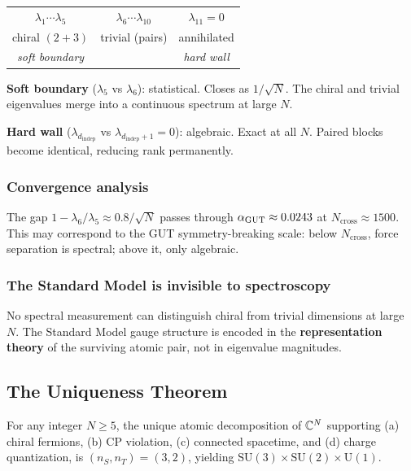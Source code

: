 \begin{center}
\begin{tabular}{ccc}
$\lambda_1 \cdots \lambda_5$ & $\lambda_6 \cdots \lambda_{10}$ & $\lambda_{11} = 0$ \\
chiral $(2+3)$ & trivial (pairs) & annihilated \\
\emph{soft boundary} & & \emph{hard wall} \\
\end{tabular}
\end{center}

\textbf{Soft boundary} ($\lambda_5$ vs $\lambda_6$): statistical. Closes as $1/\sqrt{N}$. The chiral and trivial eigenvalues merge into a continuous spectrum at large $N$.

\textbf{Hard wall} ($\lambda_{d_\text{indep}}$ vs $\lambda_{d_\text{indep}+1} = 0$): algebraic. Exact at all $N$. Paired blocks become identical, reducing rank permanently.

\subsubsection{Convergence analysis}

The gap $1 - \lambda_6/\lambda_5 \approx 0.8/\sqrt{N}$ passes through $\alpha_{\mathrm{GUT}} \approx 0.0243$ at $N_\text{cross} \approx 1500$. This may correspond to the GUT symmetry-breaking scale: below $N_\text{cross}$, force separation is spectral; above it, only algebraic.

\subsubsection{The Standard Model is invisible to spectroscopy}

No spectral measurement can distinguish chiral from trivial dimensions at large $N$. The Standard Model gauge structure is encoded in the \textbf{representation theory} of the surviving atomic pair, not in eigenvalue magnitudes.

\subsection{The Uniqueness Theorem}

\begin{theorem}[Uniqueness of $(2,3)$]
For any integer $N \geq 5$, the unique atomic decomposition of $\mathbb{C}^N$ supporting (a) chiral fermions, (b) CP violation, (c) connected spacetime, and (d) charge quantization, is $(n_S, n_T) = (3, 2)$, yielding $\text{SU}(3)\times\text{SU}(2)\times\text{U}(1)$.
\end{theorem}

